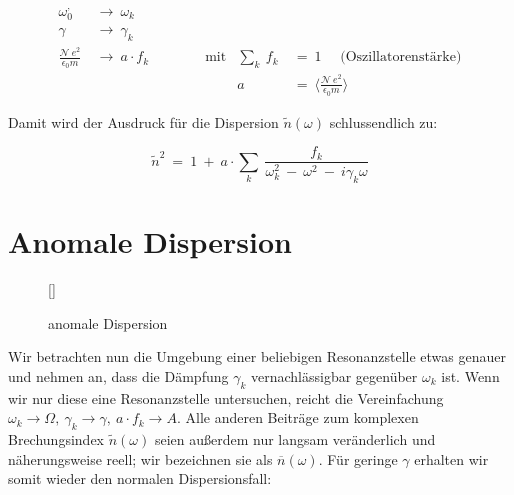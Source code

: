 \begin{align*}
\omega^{,}_0 \ &\rightarrow \ \omega_k\\
\gamma \ &\rightarrow \ \gamma_k\\
\frac{\mathcal{N} \ e^2}{\epsilon_0 m} \ &\rightarrow \ a \cdot f_k \qquad\qquad \text{mit}  &\sum_k \ f_k  \ &= \ 1 \quad \text{  (Oszillatorenstärke)}\\
& &a \ &= \ \Bigg\langle\frac{\mathcal{N}\ e^2}{\epsilon_0 m}\Bigg\rangle
\end{align*}

Damit wird der Ausdruck für die Dispersion $\tilde{n}(\omega)$ schlussendlich zu:

\begin{equation*}
\tilde{n}^2 \ = \ 1 \ + \ a \cdot\sum_k \ \frac{f_k}{\omega_k^2 \ - \ \omega^2 \ - \ i\gamma_k\omega}
\end{equation*}

\section{Anomale Dispersion}
\begin{wrapfigure}[]{r}[0cm]{0cm}
	\raisebox{0pt}[\dimexpr{}\baselineskip\relax]{
		\colorbox{hgrey}{
		} 
	}
	\caption{anomale Dispersion}
\end{wrapfigure}

Wir betrachten nun die Umgebung einer beliebigen Resonanzstelle etwas genauer und nehmen an, dass die Dämpfung $\gamma_k$ vernachlässigbar gegenüber $\omega_k$ ist. Wenn wir nur diese eine Resonanzstelle untersuchen, reicht die Vereinfachung $\omega_k \rightarrow \Omega, \ \gamma_k \rightarrow\gamma, \ a \cdot f_k \rightarrow A$. Alle anderen Beiträge zum komplexen Brechungsindex $\tilde{n}(\omega)$ seien außerdem nur  langsam veränderlich und näherungsweise reell; wir bezeichnen sie als $\overline{n}(\omega)$. Für geringe $\gamma$ erhalten wir somit wieder den normalen Dispersionsfall:

